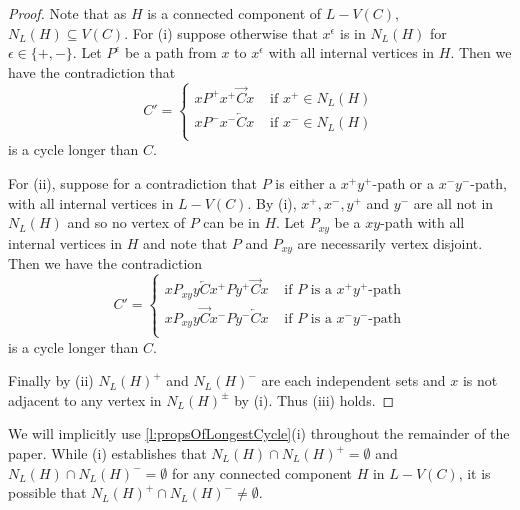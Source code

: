 \documentclass[12pt]{article}
\theoremstyle{definition}
\newcommand{\ola}{\overleftarrow{C}}
\newcommand{\ora}{\overrightarrow{C}}
\begin{document}
\begin{proof}
Note that as $H$ is a connected component of $L-V(C)$, $N_L(H) \subseteq V(C)$.
For (i) suppose otherwise that $x^\epsilon$  is in $N_L(H)$ for $\epsilon \in \{+,-\}$. Let $P^\epsilon$ be a path from $x$ to $x^\epsilon$ with all internal vertices in $H$.
Then we have the contradiction that 
\[
C'=
\begin{cases} 
xP^+x^+ \overrightarrow{C}x &\text{ if $x^+ \in N_L(H)$}\\
x P^- x^- \ola x &\text{ if $x^- \in N_L(H)$}\\
\end{cases}
\]
is a cycle longer than $C$.

For (ii), suppose for a contradiction that $P$ is either a $x^+y^+$-path or a $x^-y^-$-path, with all internal vertices in $L-V(C)$.
By (i), $x^+,x^-,y^+$ and $y^-$ are all not in $N_L(H)$ and so no vertex of $P$ can be in $H$.
Let $P_{xy}$ be a $xy$-path with all internal vertices in $H$ and note that $P$ and $P_{xy}$ are necessarily vertex disjoint.
Then we have the contradiction
\[
C' = 
\begin{cases}
x P_{xy}y \ola x^+ P y^+  \ora x &\text{ if $P$ is a $x^+y^+$-path} \\
  xP_{xy} y \ora x^- P y^-  \ola x&\text{ if $P$ is a $x^-y^-$-path} \\
\end{cases}
\]
is a cycle longer than $C$.

Finally by (ii) $N_L(H)^+$ and $N_L(H)^-$ are each independent sets and $x$ is not adjacent to any vertex in $N_L(H)^\pm$ by (i). Thus (iii) holds.
\end{proof}
\noindent
We will implicitly use \cref{l:propsOfLongestCycle}(i) throughout the remainder of the paper.
While (i) establishes that $N_L(H)\cap N_L(H)^+ = \emptyset$ and $N_L(H)\cap N_L(H)^- = \emptyset$ for any connected component $H$ in $L-V(C)$, it is possible that $N_L(H)^+ \cap N_L(H)^- \neq \emptyset$.
\end{document}
